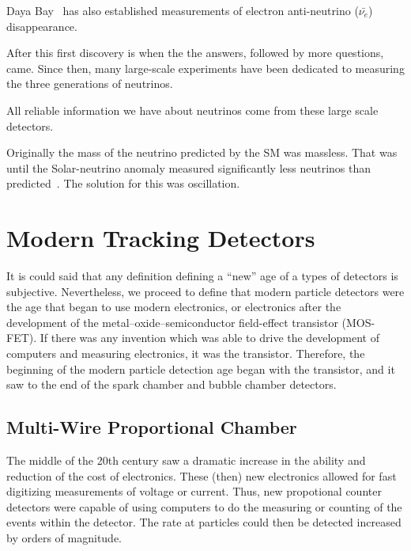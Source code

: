 Daya Bay~\citep{daya_bay_2012_neutrino_PhysRevLett.108.171803} has also established measurements of electron anti-neutrino ($\bar{\nu_{e}}$) disappearance.

After this first discovery is when the the answers, followed by more questions, came.
Since then, many large-scale experiments have been dedicated to measuring the three generations of neutrinos.
~\citep{SNO_2002_neutrino_PhysRevLett.89.011301,
neutrino_measurement_NOvA_2019_prl,
t2k_2011_neutrino_PhysRevLett.107.041801,
reno_2012_neutrino_PhysRevLett.108.191802,
FUKUDA2002_solar_neutrino_oscillation,
kamland_2003_neutrino_PhysRevLett.90.021802,
daya_bay_2012_neutrino_PhysRevLett.108.171803,
doubleChooz_2012_neutrino_PhysRevLett.108.131801}

All reliable information we have about neutrinos come from these large scale detectors.

Originally the mass of the neutrino predicted by the SM was massless.
That was until the Solar-neutrino anomaly measured significantly less neutrinos than predicted~\citep{solar_neutrino_problem_PhysRevLett.20.1205}.
The solution for this was oscillation.

\section{Modern Tracking Detectors}

It is could said that any definition defining a ``new'' age of a types of detectors is subjective.
Nevertheless, we proceed to define that modern particle detectors were the age that began to use modern electronics, or electronics after the development of the metal–oxide–semiconductor field-effect transistor (MOS-FET).
If there was any invention which was able to drive the development of computers and  measuring electronics, it was the transistor.
Therefore, the beginning of the modern particle detection age began with the transistor, and it saw to the end of the spark chamber and bubble chamber detectors.

\subsection{Multi-Wire Proportional Chamber}

The middle of the 20th century saw a dramatic increase in the ability and reduction of the cost of electronics.
These (then) new electronics allowed for fast digitizing measurements of voltage or current.
Thus, new propotional counter detectors were capable of using computers to do the measuring or counting of the events within the detector.
The rate at particles could then be detected increased by orders of magnitude.

